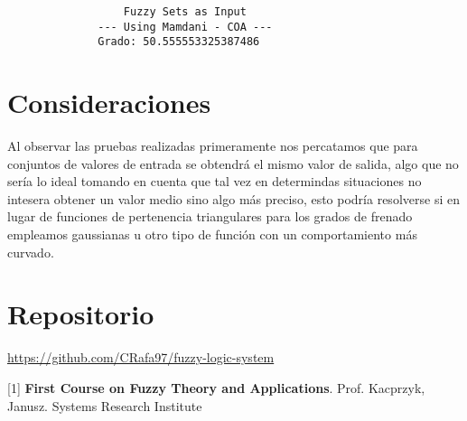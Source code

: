 \documentclass[a4paper,10pt,twocolumn]{article}
\begin{document}
\begin{verbatim}
	              Fuzzy Sets as Input  
	          --- Using Mamdani - COA --- 
	          Grado: 50.555553325387486
\end{verbatim}


\section*{Consideraciones}\label{sec:con}

Al observar las pruebas realizadas primeramente nos percatamos que para conjuntos de valores de entrada se obtendr\'a el mismo valor de salida, algo que no ser\'ia lo ideal tomando en cuenta que tal vez en determindas situaciones no intesera obtener un valor medio sino algo m\'as preciso, esto podr\'ia resolverse si en lugar de funciones de pertenencia triangulares para los grados de frenado empleamos gaussianas u otro tipo de funci\'on con un comportamiento m\'as curvado.

\section*{Repositorio}

\url{https://github.com/CRafa97/fuzzy-logic-system}

\begin{thebibliography}{9}

[1] \textbf{First Course on Fuzzy Theory and Applications}. Prof. Kacprzyk, Janusz. Systems Research Institute
	
\end{thebibliography}

\label{end}
\end{document}
